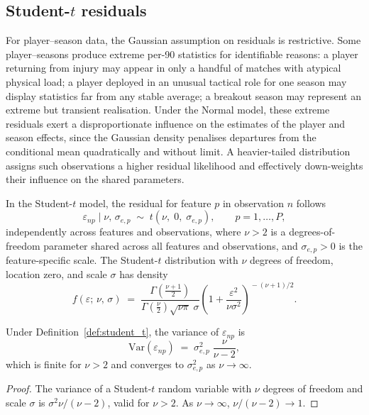 \subsection{Student-$t$ residuals}
\label{sec:t_likelihood}

For player--season data, the Gaussian assumption on residuals is restrictive. Some player--seasons produce extreme per-90 statistics for identifiable reasons: a player returning from injury may appear in only a handful of matches with atypical physical load; a player deployed in an unusual tactical role for one season may display statistics far from any stable average; a breakout season may represent an extreme but transient realisation. Under the Normal model, these extreme residuals exert a disproportionate influence on the estimates of the player and season effects, since the Gaussian density penalises departures from the conditional mean quadratically and without limit. A heavier-tailed distribution assigns such observations a higher residual likelihood and effectively down-weights their influence on the shared parameters.

\begin{definition}
\label{def:student_t}
In the Student-$t$ model, the residual for feature $p$ in observation $n$ follows
\begin{equation}
\varepsilon_{np} \mid \nu,\, \sigma_{e,p} \;\sim\; t\!\left(\nu,\; 0,\; \sigma_{e,p}\right), \qquad p = 1, \ldots, P,
\label{eq:t_resid}
\end{equation}
independently across features and observations, where $\nu > 2$ is a degrees-of-freedom parameter shared across all features and observations, and $\sigma_{e,p} > 0$ is the feature-specific scale. The Student-$t$ distribution with $\nu$ degrees of freedom, location zero, and scale $\sigma$ has density
\begin{equation}
f(\varepsilon;\, \nu,\, \sigma) \;=\; \frac{\Gamma\!\left(\tfrac{\nu+1}{2}\right)}{\Gamma\!\left(\tfrac{\nu}{2}\right)\sqrt{\nu\pi}\;\sigma} \left(1 + \frac{\varepsilon^2}{\nu\sigma^2}\right)^{\!-(\nu+1)/2}.
\label{eq:t_density}
\end{equation}
\end{definition}

\begin{proposition}
\label{prop:t_variance}
Under Definition~\ref{def:student_t}, the variance of $\varepsilon_{np}$ is
\begin{equation}
\mathrm{Var}(\varepsilon_{np}) \;=\; \sigma_{e,p}^2\;\frac{\nu}{\nu - 2},
\label{eq:t_variance}
\end{equation}
which is finite for $\nu > 2$ and converges to $\sigma_{e,p}^2$ as $\nu \to \infty$.
\end{proposition}
\begin{proof}
The variance of a Student-$t$ random variable with $\nu$ degrees of freedom and scale $\sigma$ is $\sigma^2 \nu/(\nu - 2)$, valid for $\nu > 2$. As $\nu \to \infty$, $\nu/(\nu-2) \to 1$.
\end{proof}

